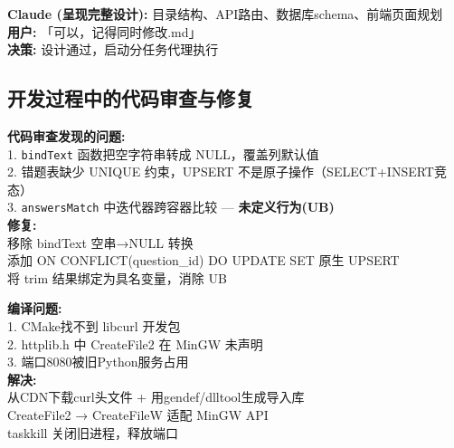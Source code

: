 \documentclass[12pt,a4paper]{ctexart}
\begin{document}
\vspace{6pt}

\begin{dialogbox}[title=对话3: 设计确认]
\textbf{Claude (呈现完整设计):} 目录结构、API路由、数据库schema、前端页面规划\\
\textbf{用户:} 「可以，记得同时修改.md」\\[4pt]
\textbf{决策:} 设计通过，启动分任务代理执行
\end{dialogbox}

\subsection{开发过程中的代码审查与修复}

\begin{dialogbox}[title=对话4: 数据库层代码审查发现Bug并修复]
\textbf{代码审查发现的问题:}\\
1. \texttt{bindText} 函数把空字符串转成 NULL，覆盖列默认值\\
2. 错题表缺少 UNIQUE 约束，UPSERT 不是原子操作（SELECT+INSERT竞态）\\
3. \texttt{answersMatch} 中迭代器跨容器比较 — \textbf{未定义行为(UB)}\\[4pt]
\textbf{修复:}\\
 移除 bindText 空串→NULL 转换\\
 添加 ON CONFLICT(question\_id) DO UPDATE SET 原生 UPSERT\\
 将 trim 结果绑定为具名变量，消除 UB
\end{dialogbox}

\vspace{6pt}

\begin{dialogbox}[title=对话5: 编译修复 — 解决 Windows 环境问题]
\textbf{编译问题:}\\
1. CMake找不到 libcurl 开发包\\
2. httplib.h 中 CreateFile2 在 MinGW 未声明\\
3. 端口8080被旧Python服务占用\\[4pt]
\textbf{解决:}\\
 从CDN下载curl头文件 + 用gendef/dlltool生成导入库\\
 CreateFile2 → CreateFileW 适配 MinGW API\\
 taskkill 关闭旧进程，释放端口
\end{dialogbox}

\vspace{6pt}
\end{document}
